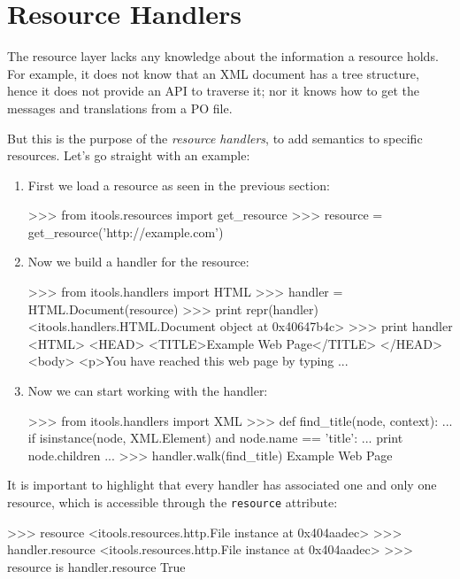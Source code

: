 \chapter{Resource Handlers}

The resource layer lacks any knowledge about the information a resource holds.
For example, it does not know that an XML document has a tree structure,
hence it does not provide an API to traverse it; nor it knows how to get
the messages and translations from a PO file.

But this is the purpose of the {\em resource handlers}, to add semantics to
specific resources. Let's go straight with an example:

\begin{enumerate}
  \item First we load a resource as seen in the previous section:
\begin{code}
    >>> from itools.resources import get_resource
    >>> resource = get_resource('http://example.com')
\end{code}

  \item Now we build a handler for the resource:
\begin{code}
    >>> from itools.handlers import HTML
    >>> handler = HTML.Document(resource)
    >>> print repr(handler)
    <itools.handlers.HTML.Document object at 0x40647b4c>
    >>> print handler
    <HTML>
    <HEAD>
      <TITLE>Example Web Page</TITLE>
    </HEAD> 
    <body>  
    <p>You have reached this web page by typing
    ...
\end{code}

  \item Now we can start working with the handler:
\begin{code}
    >>> from itools.handlers import XML
    >>> def find_title(node, context):
    ...     if isinstance(node, XML.Element) and node.name == 'title':
    ...         print node.children
    ... 
    >>> handler.walk(find_title)
    Example Web Page
\end{code}
\end{enumerate}



It is important to highlight that every handler has associated one and only
one resource, which is accessible through the {\tt resource} attribute:

\begin{code}
    >>> resource
    <itools.resources.http.File instance at 0x404aadec>
    >>> handler.resource
    <itools.resources.http.File instance at 0x404aadec>
    >>> resource is handler.resource
    True
\end{code}


